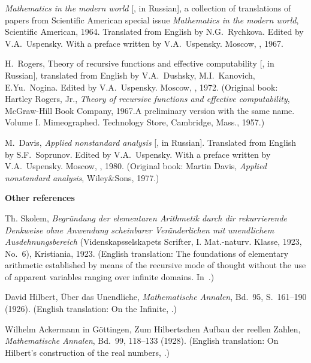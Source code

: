 \documentclass[12pt]{article}
\theoremstyle{remark}
\begin{document}
\begin{thebibliography}{99}
\emph{Mathematics in the modern world}  [\emph{}, in Russian],  a collection of translations of papers from Scientific American special issue \emph{Mathematics in the modern world}, Scientific American, 1964. Translated from English by N.G.~Rychkova. Edited by V.A.~Uspensky. With a preface written by V.A.~Uspensky. Moscow, , 1967.

H.~Rogers, Theory of recursive functions and effective computability [, in Russian], translated from English by V.A.~Dushsky, M.I.~Kanovich, E.Yu.~Nogina. Edited by V.A.~Uspensky. Moscow, , 1972. (Original book: Hartley Rogers, Jr., \emph{Theory of recursive functions and effective computability}, McGraw-Hill Book Company, 1967.A preliminary version with the same name. Volume I. Mimeographed. Technology Store, Cambridge, Mass., 1957.)

M.~Davis, \emph{Applied nonstandard analysis} [, in Russian]. Translated from English by S.F.~Soprunov. Edited by V.A.~Uspensky. With a preface written by V.A.~Uspensky. Moscow, , 1980. (Original book: Martin Davis, \emph{Applied nonstandard analysis}, Wiley\&Sons, 1977.)

\clearpage
\item[]\hspace{-\labelwidth}\hspace{-\labelsep}\textbf{Other references}

Th. Skolem, \emph{Begr\"undung der elementaren Arithmetik durch dir rekurrierende Denkweise ohne Anwendung scheinbarer Ver\"anderlichen mit unendlichem Ausdehnungsbereich} (Videnskapsselskapets Scrifter, I. Mat.-naturv. Klasse, 1923, No.~6),  Kristiania, 1923. (English translation: The foundations of elementary arithmetic established by means of the recursive mode of thought without the use of apparent variables ranging over infinite domains. In~\cite[p.~302--333]{vanHeijenoort1967}.)

David Hilbert, \"Uber das Unendliche, \emph{Mathematische Annalen}, Bd.~95, S.~161--190 (1926). (English translation:  On the Infinite,  \cite[p.~367--392]{vanHeijenoort1967}.)

Wilhelm Ackermann in G\"ottingen, Zum Hilbertschen Aufbau der reellen Zahlen, 
\emph{Mathematische Annalen}, Bd.~99, 118--133 (1928). (English translation: On Hilbert's construction of the real numbers,  \cite[p.~493--507]{vanHeijenoort1967}.)


\end{thebibliography}
\end{document}
